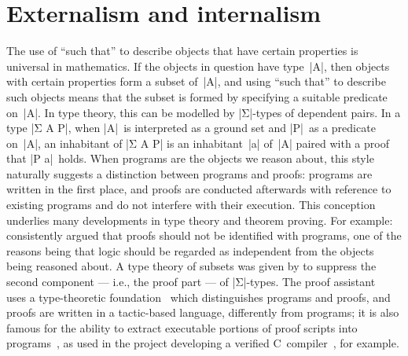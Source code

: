 \section{Externalism and internalism}
\label{sec:externalism-and-internalism}

The use of ``such that'' to describe objects that have certain properties is universal in mathematics.
If the objects in question have type~|A|, then objects with certain properties form a subset of~|A|, and using ``such that'' to describe such objects means that the subset is formed by specifying a suitable predicate on~|A|.
In type theory, this can be modelled by |Σ|-types of dependent pairs.
In a type |Σ A P|, when |A|~is interpreted as a ground set and |P|~as a predicate on~|A|, an inhabitant of |Σ A P| is an inhabitant~|a| of~|A| paired with a proof that |P a|~holds.
When programs are the objects we reason about, this style naturally suggests a distinction between programs and proofs: programs are written in the first place, and proofs are conducted afterwards with reference to existing programs and do not interfere with their execution.
This conception underlies many developments in type theory and theorem proving.
For example: \citet{Luo-type-theory} consistently argued that proofs should not be identified with programs, one of the reasons being that logic should be regarded as independent from the objects being reasoned about.
A type theory of subsets was given by \citet{Nordstrom-programming} to suppress the second component --- i.e., the proof part --- of |Σ|-types.
The proof assistant ~\citep{Bertot-Coq} uses a type-theoretic foundation~\citep{Coquand-calculus-of-constructions, Coquand-CiC} which distinguishes programs and proofs, and proofs are written in a tactic-based language, differently from programs; it is also famous for the ability to extract executable portions of proof scripts into programs~\citep{Paulin-Mohring-extraction, Letouzey-Coq-extraction}, as used in the  project developing a verified C~compiler~\citep{Leroy-CompCert}, for example.

